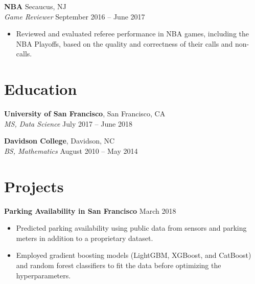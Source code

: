 \documentclass[line, margin]{res}
\begin{document}
\begin{resume}
	\textbf{NBA} \hfill{Secaucus, NJ} \vspace{1mm}\\\vspace{0.5mm}%
	\textsl{Game Reviewer} \hfill {September 2016 -- June 2017}\
	\begin{itemize}
		\item Reviewed and evaluated referee performance in NBA games, including the NBA Playoffs, based on the quality and correctness of their calls and non-calls.
	\end{itemize}
	
	
\section{Education}
	\textbf{University of San Francisco}, San Francisco, CA \vspace{1mm}\\\vspace{1mm}
	\textsl{MS, Data Science} \hfill {July 2017 -- June 2018}\

	\textbf{Davidson College}, Davidson, NC \vspace{1mm}\\\vspace{-1mm}
	\textsl{BS, Mathematics} \hfill {August 2010 -- May 2014}


\section{Projects}
	\textbf{Parking Availability in San Francisco} \hfill{March 2018}
	\begin{itemize}
		\item Predicted parking availability using public data from sensors and parking meters in addition to a proprietary dataset.
		\item Employed gradient boosting models (LightGBM, XGBoost, and CatBoost) and random forest classifiers to fit the data before optimizing the hyperparameters. %
	\end{itemize} \

		

\end{resume}
\end{document}
